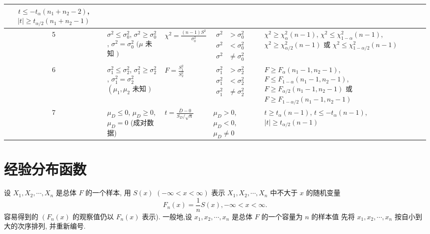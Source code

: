\begin{table}[]
\begin{tabularx}{1\textwidth}{
         c
        | >{\raggedright\arraybackslash}X
        | >{\raggedright\arraybackslash}X 
        | >{\raggedright\arraybackslash}X 
        | >{\raggedright\arraybackslash}X }
    $ t \leq-t_{\alpha}\left(n_{1}+n_{2}-2\right) $,
    $ |t| \geq t_{\alpha / 2}\left(n_{1}+n_{2}-1\right) $ \\ \hline
    5 & $ \sigma^{2} \leq \sigma_{0}^{2} $,
    $ \sigma^{2} \geq \sigma_{0}^{2} $,
    $ \sigma^{2}=\sigma_{0}^{2} $
    $ (\mu $ 未知 $ ) $ & $ \chi^{2}=\frac{(n-1) S^{2}}{\sigma_{0}^{2}} $ & $ \begin{aligned} \sigma^{2} &>\sigma_{0}^{2} \\ \sigma^{2} &<\sigma_{0}^{2} \\ \sigma^{2} & \neq \sigma_{0}^{2} \end{aligned} $ & $ \chi^{2} \geq \chi_{\alpha}^{2}(n-1) $,
    $ \chi^{2} \leq \chi_{1-\alpha}^{2}(n-1) $,
    $ \chi^{2} \geq \chi_{\alpha / 2}^{2}(n-1) $ 或
    $ \chi^{2} \leq \chi_{1-\alpha / 2}^{2}(n-1) $ \\ \hline
    6 & $ \sigma_{1}^{2} \leq \sigma_{2}^{2} $,
    $ \sigma_{1}^{2} \geq \sigma_{2}^{2} $,
    $ \sigma_{1}^{2}=\sigma_{2}^{2} $
    $ \left(\mu_{1}, \mu_{2}\right. $ 未知 $ ) $ & $ F=\frac{S_{1}^{2}}{S_{2}^{2}} $ & $ \begin{aligned} \sigma_{1}^{2} &>\sigma_{2}^{2} \\ \sigma_{1}^{2} &<\sigma_{2}^{2} \\ \sigma_{1}^{2} & \neq \sigma_{2}^{2} \end{aligned} $ & $ F \geq F_{\alpha}\left(n_{1}-1, n_{2}-1\right) $,
    $ F \leq F_{1-\alpha}\left(n_{1}-1, n_{2}-1\right) $,
    $ F \geq F_{\alpha / 2}\left(n_{1}-1, n_{2}-1\right) $ 或
    $ F \geq F_{1-\alpha / 2}\left(n_{1}-1, n_{2}-1\right) $ \\ \hline
    7 & $ \mu_{D} \leq 0 $,
    $ \mu_{D} \geq 0 $,
    $ \mu_{D}=0 $
    (成对数据) & $ t=\frac{\bar{D}-0}{S_{D} / \sqrt{n}} $ & $ \mu_{D}>0 $,
    $ \mu_{D}<0 $,
    $ \mu_{D} \neq 0 $ &  $ t \geq t_{\alpha}(n-1) $,
    $ t \leq-t_{\alpha}(n-1) $,
    $ |t| \geq t_{\alpha / 2}(n-1) $\\ \hline
    
    \end{tabularx}
\end{table}

\section{经验分布函数}

设 $ X_{1}, X_{2}, \cdots, X_{n} $ 是总体 $ {F} $ 的一个样本, 用 $ S({x}) $
$ (-\infty<x<\infty) $ 表示 $ X_{1}, X_{2}, \cdots, X_{n} $ 中不大于 $ x $ 的随机变量
$$
F_{n}(x)=\frac{1}{n} S(x),-\infty<x<\infty .
$$
容易得到的 $ \left({F}_{n}({x})\right. $ 的观察值仍以 $ {F}_{n}({x}) $ 表示). 
一般地,设 $ {x}_{1}, {x}_{2}, \cdots, {x}_{n} $ 是总体 $ {F} $ 的一个容量为 $ {n} $ 的样本值
先将 $ {x}_{1}, {x}_{2}, \cdots, {x}_{n} $ 按自小到大的次序排列, 并重新编号. 

